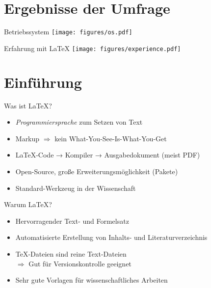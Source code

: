 \section[Umfrage]{Ergebnisse der Umfrage}

\begin{frame}{Betriebssystem}
  \centering
  \texttt{[image: figures/os.pdf]}
\end{frame}

\begin{frame}{Erfahrung mit \LaTeX}
  \centering
  \texttt{[image: figures/experience.pdf]}
\end{frame}

\section{Einführung}

\begin{frame}{Was ist \LaTeX?}
  \Large
  \linespread{1.5}
  \begin{itemize}
    \item \emph{Programmiersprache} zum Setzen von Text
    \item Markup $\Rightarrow$ kein
      \textcolor{vertexDarkRed}{W}hat-\textcolor{vertexDarkRed}{Y}ou-\textcolor{vertexDarkRed}{S}ee-\textcolor{vertexDarkRed}{I}s-\textcolor{vertexDarkRed}{W}hat-\textcolor{vertexDarkRed}{Y}ou-\textcolor{vertexDarkRed}{G}et

    \item \LaTeX-Code → Kompiler → Ausgabedokument (meist PDF)
    \item Open-Source, große Erweiterungsmöglichkeit (Pakete)
    \item Standard-Werkzeug in der Wissenschaft
  \end{itemize}
  \linespread{1.0}
\end{frame}

\begin{frame}{Warum \LaTeX?}
  \Large
  \linespread{1.5}
  \begin{itemize}
    \item Hervorragender Text- und Formelsatz
    \item Automatisierte Erstellung von Inhalts- und Literaturverzeichnis
    \item \TeX-Dateien sind reine Text-Dateien \\
      $\Rightarrow$ Gut für Versionskontrolle geeignet
    \item Sehr gute Vorlagen für wissenschaftliches Arbeiten
  \end{itemize}
  \linespread{1.0}
\end{frame}

